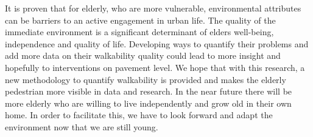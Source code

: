 It is proven that for elderly, who are more vulnerable, environmental attributes can be barriers to an active engagement in urban life. The quality of the immediate environment is a significant determinant of elders well-being, independence and quality of life. Developing ways to quantify their problems and add more data on their walkability quality could lead to more insight and hopefully to interventions on pavement level. We hope that with this research, a new methodology to quantify walkability is provided and makes the elderly pedestrian more visible in data and research. In the near future there will be more elderly who are willing to live independently and grow old in their own home. In order to facilitate this, we have to look forward and adapt the environment now that we are still young. 




 

